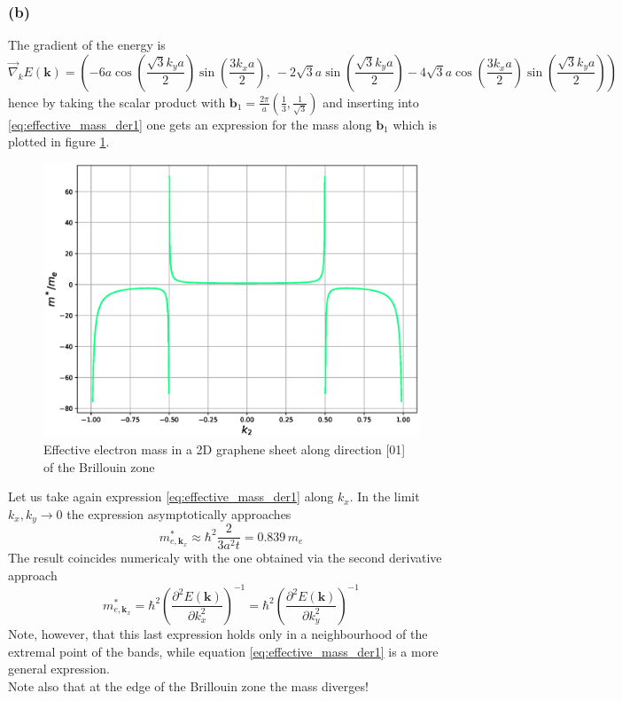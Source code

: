 \documentclass{article}
\newcommand{\ve}[1]{\mathbf{#1}}
\begin{document}
\subsubsection*{(b)}
The gradient of the energy is 
\begin{equation*}
    \vec \nabla_k E(\ve k) = \left(
        -6a\cos\left(\frac{\sqrt{3}k_ya}{2}\right)
        \sin\left(\frac{3k_xa}{2}\right), \ 
        -2\sqrt{3}a\sin\left(\frac{\sqrt{3}k_ya}{2}\right) 
        -4\sqrt{3}a\cos\left(\frac{3k_xa}{2}\right) 
        \sin\left(\frac{\sqrt{3}k_ya}{2}\right) 
    \right)
\end{equation*}
hence by taking the scalar product with $\ve b_1 = \frac{2\pi}{a}(\frac{1}{3}, \frac{1}{\sqrt{3}})$ and inserting into \ref{eq:effective_mass_der1} one gets an expression for the mass along 
$\ve b_1$ which is plotted in figure \ref{fig:m_eff}.
\begin{figure}
    \centering 
    \includegraphics[scale=0.5]{meff.eps}
    \caption{Effective electron mass in a 2D graphene sheet along direction [01] of the Brillouin zone}
    \label{fig:m_eff}
\end{figure}
Let us take again expression \ref{eq:effective_mass_der1} along $k_x$. In the limit $k_x,k_y \to 0$ the expression asymptotically approaches
\begin{equation*}
    m_{e, \ve k_x}^* \approx \hbar^2 \frac{2}{3a^2t} = 0.839 \, m_e
\end{equation*}
The result coincides numericaly with the one obtained via the second derivative approach
\begin{equation*}
    m_{e, \ve k_x}^* = \hbar^2\left(\frac{\partial^2 E(\ve k)}{\partial k_x^2}\right)^{-1} = \hbar^2\left(\frac{\partial^2 E(\ve k)}{\partial k_y^2}\right)^{-1}
\end{equation*}
Note, however, that this last expression holds only in a neighbourhood of the extremal point of the bands, while equation \ref{eq:effective_mass_der1} is a more general expression. \\
Note also that at the edge of the Brillouin zone the mass diverges!
\end{document}
